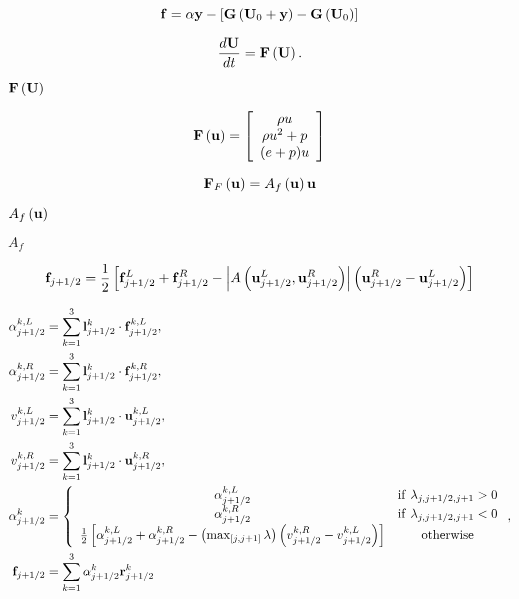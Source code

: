 \documentclass{article}
\begin{document}
\begin{equation} {\bf f} = \alpha {\bf y} - \left[ {\bf G}\left({\bf U}_0+{\bf y}\right)-{\bf G}\left({\bf U}_0\right) \right] \end{equation}
\pagebreak

\begin{equation} \frac {d{\bf U}} {dt} = {\bf F}\left({\bf U}\right). \end{equation}
\pagebreak

${\bf F}\left({\bf U}\right)$
\pagebreak

\begin{equation} {\bf F}\left({\bf u}\right) = \left[\begin{array}{c} \rho u \\ \rho u^2 + p \\ (e+p) u \end{array}\right] \end{equation}
\pagebreak

\begin{equation} {\bf F}_F\left({\bf u}\right) = A_f\left({\bf u}\right){\bf u} \end{equation}
\pagebreak

$A_f\left({\bf u}\right) $
\pagebreak

$A_f$
\pagebreak

\begin{equation} {\bf f}_{j+1/2} = \frac{1}{2}\left[ {\bf f}_{j+1/2}^L + {\bf f}_{j+1/2}^R - \left| A\left({\bf u}_{j+1/2}^L,{\bf u}_{j+1/2}^R\right) \right| \left( {\bf u}_{j+1/2}^R - {\bf u}_{j+1/2}^L \right)\right] \end{equation}
\pagebreak

\begin{align} \alpha_{j+1/2}^{k,L} &= \sum_{k=1}^3 {\bf l}_{j+1/2}^k \cdot {\bf f}_{j+1/2}^{k,L}, \\ \alpha_{j+1/2}^{k,R} &= \sum_{k=1}^3 {\bf l}_{j+1/2}^k \cdot {\bf f}_{j+1/2}^{k,R}, \\ v_{j+1/2}^{k,L} &= \sum_{k=1}^3 {\bf l}_{j+1/2}^k \cdot {\bf u}_{j+1/2}^{k,L}, \\ v_{j+1/2}^{k,R} &= \sum_{k=1}^3 {\bf l}_{j+1/2}^k \cdot {\bf u}_{j+1/2}^{k,R}, \\ \alpha_{j+1/2}^k &= \left\{ \begin{array}{cc} \alpha_{j+1/2}^{k,L} & {\rm if}\ \lambda_{j,j+1/2,j+1} > 0 \\ \alpha_{j+1/2}^{k,R} & {\rm if}\ \lambda_{j,j+1/2,j+1} < 0 \\ \frac{1}{2}\left[ \alpha_{j+1/2}^{k,L} + \alpha_{j+1/2}^{k,R} - \left(\max_{\left[j,j+1\right]} \lambda\right) \left( v_{j+1/2}^{k,R} - v_{j+1/2}^{k,L} \right) \right] & {\rm otherwise} \end{array}\right., \\ {\bf f}_{j+1/2} &= \sum_{k=1}^3 \alpha_{j+1/2}^k {\bf r}_{j+1/2}^k \end{align}
\pagebreak
\end{document}
